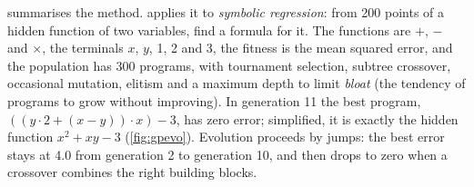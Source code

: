  summarises the method.  applies it to \emph{symbolic regression}: from 200
points of a hidden function of two variables, find a formula for it. The functions are $+$, $-$ and
$\times$, the terminals $x$, $y$, 1, 2 and 3, the fitness is the mean squared error, and the population
has 300 programs, with tournament selection, subtree crossover, occasional mutation, elitism and a
maximum depth to limit \emph{bloat} (the tendency of programs to grow without improving). In generation
11 the best program, $((y\cdot2+(x-y))\cdot x)-3$, has zero error; simplified, it is exactly the hidden
function $x^2+xy-3$ (\cref{fig:gpevo}). Evolution proceeds by jumps: the best error stays at 4.0 from generation 2 to generation 10,
and then drops to zero when a crossover combines the right building blocks.

